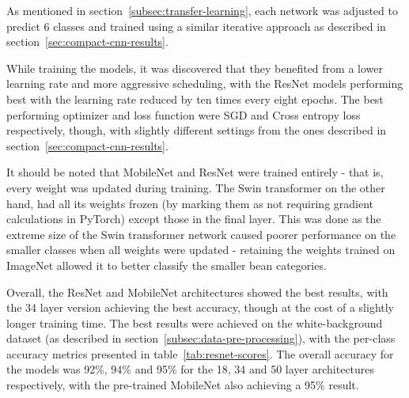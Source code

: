 As mentioned in section~\ref{subsec:transfer-learning}, each network was adjusted to predict 6 classes and trained using a similar
iterative approach as described in section~\ref{sec:compact-cnn-results}.

While training the models, it was discovered that they benefited from a lower learning rate and more aggressive scheduling,
with the ResNet models performing best with the learning rate reduced by ten times every eight epochs.
The best performing optimizer and loss function were SGD and Cross entropy loss respectively, though, with slightly different settings
from the ones described in section~\ref{sec:compact-cnn-results}.

It should be noted that MobileNet and ResNet were trained entirely - that is, every weight was updated during training.
The Swin transformer on the other hand, had all its weights frozen (by marking them as not requiring gradient calculations in PyTorch)
except those in the final layer.
This was done as the extreme size of the Swin transformer network caused poorer performance on the smaller classes when all weights were updated -
retaining the weights trained on ImageNet allowed it to better classify the smaller bean categories.

Overall, the ResNet and MobileNet architectures showed the best results, with the 34 layer version achieving the best accuracy, though at the cost of a slightly longer
training time.
The best results were achieved on the white-background dataset (as described in section~\ref{subsec:data-pre-processing}),
with the per-class accuracy metrics presented in table~\ref{tab:resnet-scores}.
The overall accuracy for the models was 92\%, 94\% and 95\% for the 18, 34 and 50 layer architectures respectively, with the
pre-trained MobileNet also achieving a 95\% result.

